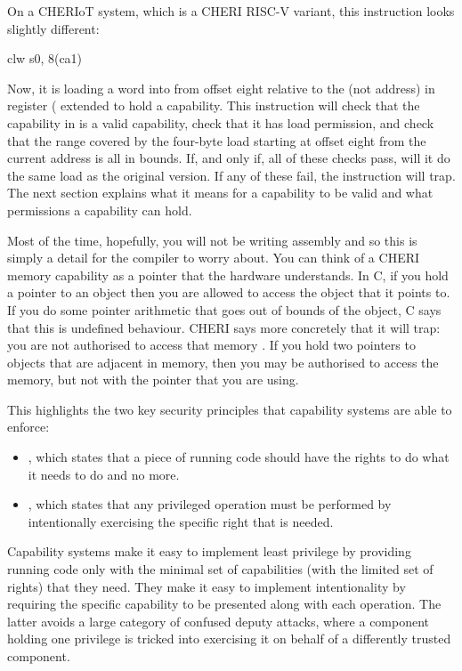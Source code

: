 On a CHERIoT system, which is a CHERI RISC-V variant, this instruction looks slightly different:

\begin{asmsnippet}
	clw	s0, 8(ca1)
\end{asmsnippet}

Now, it is loading a word into  from offset eight relative to the  (not address) in register  ( extended to hold a capability.
This instruction will check that the capability in  is a valid capability, check that it has load permission, and check that the range covered by the four-byte load starting at offset eight from the current address is all in bounds.
If, and only if, all of these checks pass, will it do the same load as the original version.
If any of these fail, the instruction will trap.
The next section explains what it means for a capability to be valid and what permissions a capability can hold.

Most of the time, hopefully, you will not be writing assembly and so this is simply a detail for the compiler to worry about.
You can think of a CHERI memory capability as a pointer that the hardware understands.
In C, if you hold a pointer to an object then you are allowed to access the object that it points to.
If you do some pointer arithmetic that goes out of bounds of the object, C says that this is undefined behaviour.
CHERI says more concretely that it will trap: you are not authorised to access that memory .
If you hold two pointers to objects that are adjacent in memory, then you may be authorised to access the memory, but not with the pointer that you are using.

This highlights the two key security principles that capability systems are able to enforce:

\begin{itemize}
	\item{, which states that a piece of running code should have the rights to do what it needs to do and no more.}
	\item{, which states that any privileged operation must be performed by intentionally exercising the specific right that is needed.}
\end{itemize}

Capability systems make it easy to implement least privilege by providing running code only with the minimal set of capabilities (with the limited set of rights) that they need.
They make it easy to implement intentionality by requiring the specific capability to be presented along with each operation.
The latter avoids a large category of confused deputy attacks, where a component holding one privilege is tricked into exercising it on behalf of a differently trusted component.

